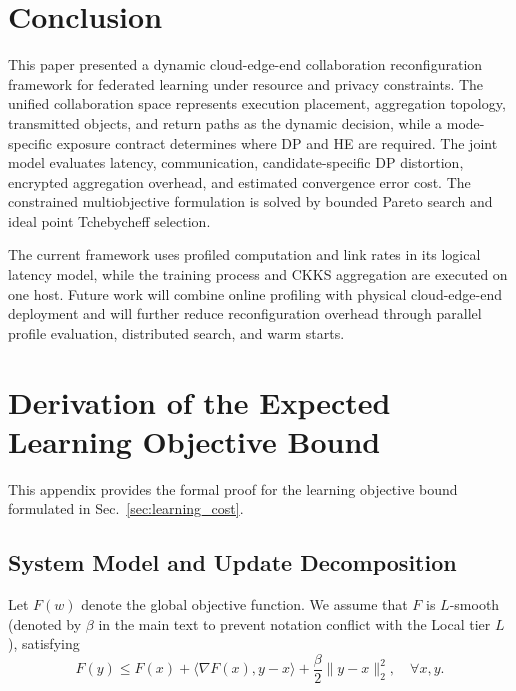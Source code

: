 \documentclass[5p,times]{elsarticle}
\theoremstyle{plain}
\theoremstyle{definition}
\theoremstyle{remark}
\begin{document}
\section{Conclusion}
\label{sec:conclusion}
This paper presented a dynamic cloud-edge-end collaboration reconfiguration
framework for federated learning under resource and privacy constraints. The
unified collaboration space represents execution placement, aggregation
topology, transmitted objects, and return paths as the dynamic decision, while a
mode-specific exposure contract determines where DP and HE are required. The
joint model evaluates latency, communication, candidate-specific DP distortion,
encrypted aggregation overhead, and estimated convergence error cost. The constrained multiobjective formulation is solved by bounded Pareto
search and ideal point Tchebycheff selection.

The current framework uses profiled computation and link rates in its logical
latency model, while the training process and CKKS aggregation are executed on
one host. Future work will combine online profiling with physical
cloud-edge-end deployment and will further reduce reconfiguration overhead
through parallel profile evaluation, distributed search, and warm starts.

\appendix
\section{Derivation of the Expected Learning Objective Bound}
\label{app:convergence_proof}

This appendix provides the formal proof for the learning objective bound formulated in Sec.~\ref{sec:learning_cost}.

\subsection{System Model and Update Decomposition}
Let $F(w)$ denote the global objective function. We assume that $F$ is $L$-smooth (denoted by $\beta$ in the main text to prevent notation conflict with the Local tier $L$), satisfying
\begin{equation}
F(y) \le F(x) + \langle \nabla F(x), y - x \rangle + \frac{\beta}{2}\|y - x\|_2^2, \quad \forall x, y.
\label{eq:app_smoothness}
\end{equation}
\end{document}
